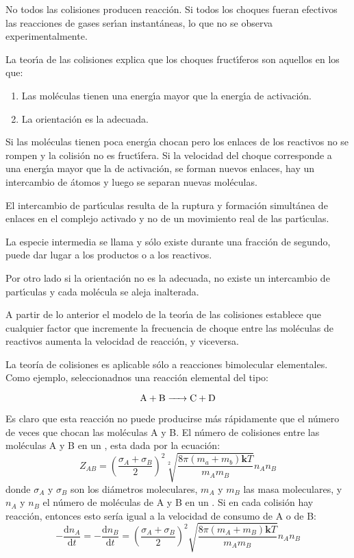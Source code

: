 No todos las colisiones  producen reacci\'on. Si todos los
choques fueran efectivos las reacciones de gases ser\'{\i}an
instant\'aneas, lo que no se observa experimentalmente.

La teor\'{\i}a de las colisiones explica que los choques  fruct\'{\i}feros son aquellos en los que:
\begin{enumerate}
\item Las mol\'eculas tienen una energ\'{\i}a mayor que la
energ\'{\i}a de activaci\'on.
\item La orientaci\'on es la adecuada.
\end{enumerate}
Si las mol\'eculas tienen poca energ\'{\i}a chocan pero los enlaces de los reactivos no se rompen y la colisi\'on no es fruct\'{\i}fera. Si la velocidad del choque corresponde a una energ\'{\i}a mayor que la de activaci\'on, se forman nuevos enlaces, hay un intercambio de \'atomos y luego se separan nuevas mol\'e\-culas.

El intercambio de part\'{\i}culas resulta de la ruptura y formaci\'on simult\'a\-nea de enlaces en el complejo
activado y no de un movimiento real de las part\'{\i}culas.

La especie intermedia se llama \textbf{}
y s\'olo existe durante una fracci\'on de segundo, puede dar
lugar a los productos o a los reactivos.

Por otro lado si la orientaci\'on no es la adecuada, no existe un intercambio de part\'{\i}culas y cada mol\'ecula se aleja inalterada.

A partir de lo anterior el modelo de la teor\'{\i}a de las colisiones establece que cualquier factor que incremente la frecuencia de choque entre las mo\-l\'e\-culas de reactivos aumenta la velocidad de reacci\'on, y viceversa.

La teoría de colisiones es aplicable sólo a reacciones bimolecular elementales. Como ejemplo, seleccionadnos una reacción elemental del tipo:

$$\ce{A + B -> C + D}$$

Es claro que esta reacción no puede producirse más rápidamente que el número de veces que chocan las moléculas A y B. El número de colisiones entre las moléculas A y B en un \centi\square\metre\per\second, esta dada por la ecuación:
\begin{equation}
 Z_{AB}= \left( \frac{ \sigma_A+ \sigma_B }{2}\right)^2 \sqrt[2]{\frac{8 \pi(m_a+m_b)\textbf{k}T }{m_Am_B}} n_An_B 
\end{equation}
donde $\sigma_A$ y $\sigma_B$  son los diámetros moleculares, $m_A$ y $m_B$ las masa moleculares, y $n_A$ y $n_B$ el número de moléculas de A y B en un \centi\cubic\metre. Si en cada colisión hay reacción, entonces esto sería igual a la velocidad de consumo de A o de B:
\begin{equation}
 -\frac{\mathrm{d}n_A}{\mathrm{d}t}=-\frac{\mathrm{d}n_B}{\mathrm{d}t}=\left(\frac{ \sigma_A+ \sigma_B }{ 2 }\right)^2 \sqrt{\frac{8 \pi(m_A+m_B)\textbf{k}T }{m_Am_B}}n_An_B 
\end{equation}



